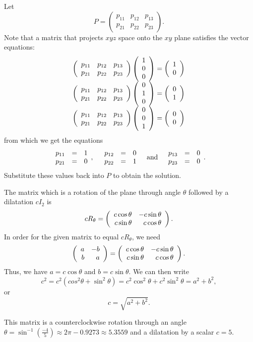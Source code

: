 \documentclass{ximera}
\begin{document}
\soln Let
\[ P = \left(\begin{array}{rrr} p_{11} & p_{12} & p_{13} \\
p_{21} & p_{22} & p_{23}\end{array}\right). \]
Note that a matrix that projects $xyz$ space onto the $xy$ plane
satisfies the vector equations:
\[ \begin{array}{c} \left(\begin{array}{rrr} p_{11} & p_{12} &
p_{13} \\ p_{21} & p_{22} & p_{23} \end{array}\right)
\left(\begin{array}{r} 1 \\ 0 \\ 0\end{array}\right) = \left(\begin{array}{r} 1 \\ 0\end{array}\right) \\
\left(\begin{array}{rrr} p_{11} & p_{12} & p_{13} \\ p_{21} &
p_{22} & p_{23} \end{array}\right) \left(\begin{array}{r} 0 \\ 1 \\ 0\end{array}\right) = \left(\begin{array}{r} 0 \\ 1\end{array}\right) \\
\left(\begin{array}{rrr} p_{11} & p_{12} & p_{13} \\ p_{21} & p_{22}
& p_{23} \end{array}\right) \left(\begin{array}{r} 0 \\ 0 \\ 1\end{array}\right) = \left(\begin{array}{r} 0 \\ 0\end{array}\right) \end{array} 
\]
from which we get the equations
\[ \begin{array}{rrrrrrr}
p_{11} & = & 1 \\
p_{21} & = & 0 \end{array},
\quad
\begin{array}{rrrrrrr}
p_{12} & = & 0 \\
p_{22} & = & 1 \end{array}
\quad\mbox{and}\quad
\begin{array}{rrrrrrr}
p_{13} & = & 0 \\
p_{23} & = & 0 \end{array}. 
\]
Substitute these values back into $P$ to obtain the solution.

 The matrix which is a rotation of the plane 
through angle $\theta$ followed by a dilatation $cI_2$ is
\[
cR_\theta =
\left(\begin{array}{rr} c\cos\theta & -c\sin\theta\\ c\sin\theta &c\cos\theta\end{array}\right).
\]
In order for the given matrix to equal $cR_\theta$, we need
\[
\left(\begin{array}{rr} a & -b\\ b &a\end{array}\right) =
\left(\begin{array}{rr} c\cos\theta & -c\sin\theta\\ c\sin\theta &c\cos\theta\end{array}\right).
\]
Thus, we have $a = c\cos\theta$ and $b = c\sin\theta$.  We can then write
\[
c^2 = c^2(cos^2\theta + \sin^2\theta) = c^2\cos^2\theta + c^2\sin^2\theta
= a^2 + b^2,
\]
or
\[
c = \sqrt{a^2 + b^2}.
\]

 \ans This matrix is a counterclockwise rotation through an 
angle $\theta = \sin^{-1}\left(\frac{-4}{5}\right) \approx 2\pi-0.9273
\approx 5.3559$ and a dilatation by a scalar $c = 5$.
\end{document}
